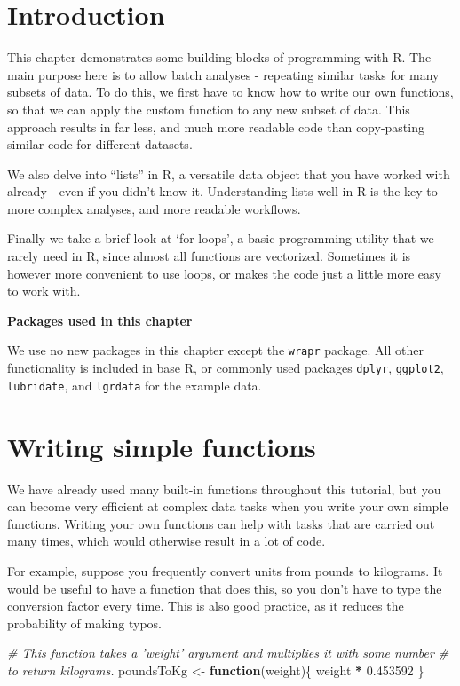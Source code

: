\documentclass[]{book}
\newenvironment{Shaded}{\begin{snugshade}}{\end{snugshade}}
\newcommand{\CommentTok}[1]{\textcolor[rgb]{0.56,0.35,0.01}{\textit{#1}}}
\newcommand{\ControlFlowTok}[1]{\textcolor[rgb]{0.13,0.29,0.53}{\textbf{#1}}}
\newcommand{\FloatTok}[1]{\textcolor[rgb]{0.00,0.00,0.81}{#1}}
\newcommand{\NormalTok}[1]{#1}
\newcommand{\OperatorTok}[1]{\textcolor[rgb]{0.81,0.36,0.00}{\textbf{#1}}}
\newcommand{\StringTok}[1]{\textcolor[rgb]{0.31,0.60,0.02}{#1}}
\begin{document}
\hypertarget{introduction-3}{%
\section{Introduction}\label{introduction-3}}

This chapter demonstrates some building blocks of programming with R. The main purpose here is to allow batch analyses - repeating similar tasks for many subsets of data. To do this, we first have to know how to write our own functions, so that we can apply the custom function to any new subset of data. This approach results in far less, and much more readable code than copy-pasting similar code for different datasets.

We also delve into ``lists'' in R, a versatile data object that you have worked with already - even if you didn't know it. Understanding lists well in R is the key to more complex analyses, and more readable workflows.

Finally we take a brief look at `for loops', a basic programming utility that we rarely need in R, since almost all functions are vectorized. Sometimes it is however more convenient to use loops, or makes the code just a little more easy to work with.

\textbf{Packages used in this chapter}

We use no new packages in this chapter except the \texttt{wrapr} package. All other functionality is included in base R, or commonly used packages \texttt{dplyr}, \texttt{ggplot2}, \texttt{lubridate}, and \texttt{lgrdata} for the example data.

\hypertarget{writefunctions}{%
\section{Writing simple functions}\label{writefunctions}}

We have already used many built-in functions throughout this tutorial, but you can become very efficient at complex data tasks when you write your own simple functions. Writing your own functions can help with tasks that are carried out many times, which would otherwise result in a lot of code.

For example, suppose you frequently convert units from pounds to kilograms. It would be useful to have a function that does this, so you don't have to type the conversion factor every time. This is also good practice, as it reduces the probability of making typos.

\begin{Shaded}
\begin{Highlighting}[]
\CommentTok{# This function takes a 'weight' argument and multiplies it with some number }
\CommentTok{# to return kilograms.}
\NormalTok{poundsToKg <-}\StringTok{ }\ControlFlowTok{function}\NormalTok{(weight)\{}
\NormalTok{  weight }\OperatorTok{*}\StringTok{ }\FloatTok{0.453592}
\NormalTok{\}}
\end{Highlighting}
\end{Shaded}
\end{document}
